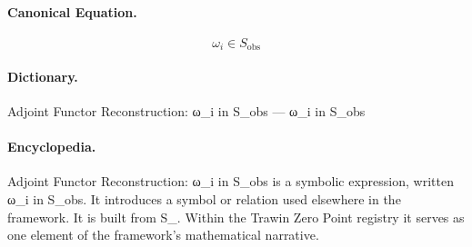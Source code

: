 \paragraph{Canonical Equation.}
\[
\omega_i \in S_{\text{obs}}
\]

\paragraph{Dictionary.}
Adjoint Functor Reconstruction: ω\_i in S\_obs — ω\_i in S\_obs

\paragraph{Encyclopedia.}
Adjoint Functor Reconstruction: ω\_i in S\_obs is a symbolic expression, written ω\_i in S\_obs. It introduces a symbol or relation used elsewhere in the framework. It is built from S\_. Within the Trawin Zero Point registry it serves as one element of the framework's mathematical narrative.
